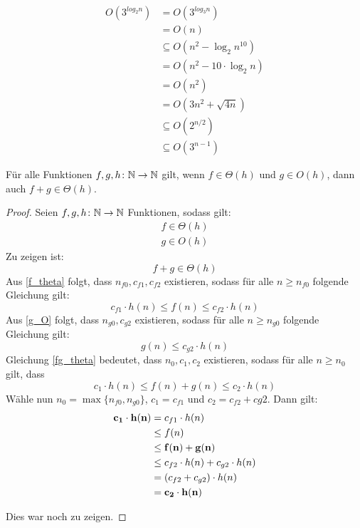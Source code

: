 
\begin{example}
	\begin{align*}
		O(3^{log_2{n}})
		& = O(3^{log_3{n}}) \\
		& = O(n) \\
		& \subseteq O(n^2 - \log_2{n^{10}}) \\
		& = O(n^2 - 10 \cdot \log_2{n}) \\
		& = O(n^2) \\
		& = O(3n^2 + \sqrt{4n}) \\
		& \subseteq O(2^{n/2}) \\
		& \subseteq O(3^{n-1})
	\end{align*}
\end{example}

\begin{lemma}
	Für alle Funktionen $f,g,h \colon \mathbb{N} \rightarrow \mathbb{N}$ gilt,
	wenn $f \in \Theta(h)$ und $g \in O(h)$, dann auch $f + g \in
	\Theta(h)$.
\end{lemma}
\begin{proof}
	Seien $f,g,h \colon \mathbb{N} \rightarrow \mathbb{N}$ Funktionen, sodass gilt:
	\begin{align}
		f \in \Theta(h) \label{f_theta} \\
		g \in O(h) \label{g_O}
	\end{align}
	Zu zeigen ist:
	\begin{equation}
		f + g \in \Theta(h) \label{fg_theta}
	\end{equation}
	Aus \eqref{f_theta} folgt, dass $n_{f0},c_{f1},c_{f2}$ existieren, 
	sodass für alle $n \geq n_{f0}$ folgende Gleichung gilt:
	\begin{equation}
		c_{f1} \cdot h(n) \leq f(n) \leq c_{f2} \cdot h(n)
	\end{equation}
	Aus \eqref{g_O} folgt, dass $n_{g0},c_{g2}$ existieren, sodass für alle
	$n \geq n_{g0}$ folgende Gleichung gilt:
	\begin{equation}
		g(n) \leq c_{g2} \cdot h(n)
	\end{equation}
	Gleichung \eqref{fg_theta} bedeutet, dass $n_0,c_1,c_2$ existieren,
	sodass für alle $n \geq n_0$ gilt, dass
	\begin{equation}
		c_1 \cdot h(n) \leq f(n) + g(n) \leq c_2 \cdot h(n)
	\end{equation}
	Wähle nun $n_0 = \max{\{n_{f0},n_{g0}\}}$, $c_1 = c_{f1}$ und $c_2 = c_{f2} + c{g2}$. Dann
	gilt:
	\begin{align*}
		\bf c_1 \cdot h(n)
		& = c_{f1} \cdot h(n) \\
		& \leq f(n) \\
		& \leq \bf f(n) + g(n) \\
		& \leq c_{f2} \cdot h(n) + c_{g2} \cdot h(n) \\
		& = (c_{f2} + c_{g2}) \cdot h(n) \\
		& = \bf c_2 \cdot h(n)
	\end{align*}

	Dies war noch zu zeigen.
\end{proof}

